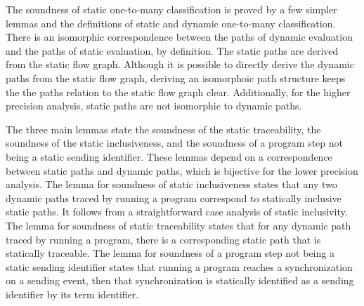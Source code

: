 \documentclass[letterpaper, 11pt]{extarticle}
\begin{document}
The soundness of static one-to-many classification is proved by a few simpler lemmas and the
definitions of static and dynamic one-to-many classification.
There is an isomorphic correspondence between the paths of
dynamic evaluation and the paths of static evaluation, by definition.
The static paths are derived from the static flow graph. Although it is possible to directly derive
the dynamic paths from the static flow graph, deriving an isomorphoic path structure keeps the the
paths relation to the static flow graph clear.  Additionally, for the higher precision analysis, static
paths are not isomorphic to dynamic paths. 

The three main lemmas state the
soundness of the static traceability, the soundness of the static inclusiveness, and
the soundness of a program step not being a static sending identifier. These lemmas depend on a
correspondence between static paths and dynamic paths, which is bijective for the lower
precision analysis. The lemma for soundness of static inclusiveness states that any two
dynamic paths traced by running a program correspond to statically inclusive static paths. It
follows from a straightforward case analysis of static inclusivity. The lemma for soundness of
static traceability states that for any dynamic path traced by running a program, there
is a corresponding static path that is statically traceable. The lemma for soundness of a
program step not being a static sending identifier states that running a program reaches a
synchronization on a sending event, then that synchronization is statically identified as a
sending identifier by its term identifier.
\end{document}
